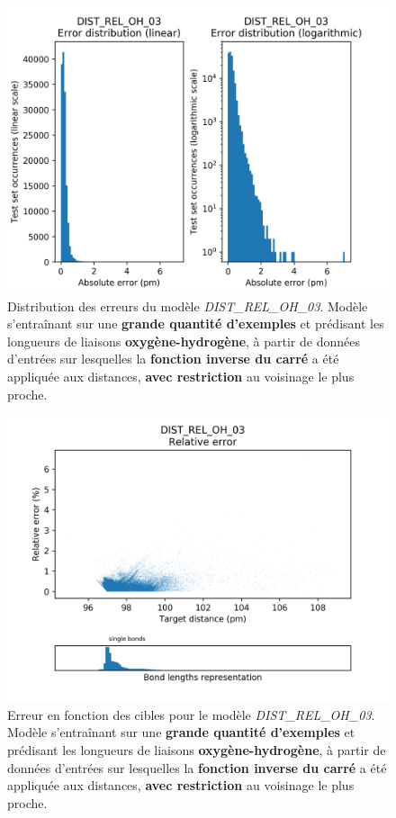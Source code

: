 \begin{figure}[!h]
	\centering
	
	\includegraphics[scale=0.75]{../figures/DIST_REL_OH_03/DIST_REL_OH_03_distrib_rmse_val.png}	
	
	\caption{Distribution des erreurs du modèle \emph{DIST\_REL\_OH\_03}. Modèle s'entraînant sur une \textbf{grande quantité d'exemples} et prédisant les longueurs de liaisons \textbf{oxygène-hydrogène}, à partir de données d'entrées sur lesquelles la \textbf{fonction inverse du carré} a été appliquée aux distances, \textbf{avec restriction} au voisinage le plus proche.}
\end{figure}

\begin{figure}[!h]
	\centering
	
	\includegraphics[scale=0.75]{../figures/DIST_REL_OH_03/DIST_REL_OH_03_distrib_rmse_dist.png}	
	
	\caption{Erreur en fonction des cibles pour le modèle \emph{DIST\_REL\_OH\_03}. Modèle s'entraînant sur une \textbf{grande quantité d'exemples} et prédisant les longueurs de liaisons \textbf{oxygène-hydrogène}, à partir de données d'entrées sur lesquelles la \textbf{fonction inverse du carré} a été appliquée aux distances, \textbf{avec restriction} au voisinage le plus proche.}
\end{figure}

